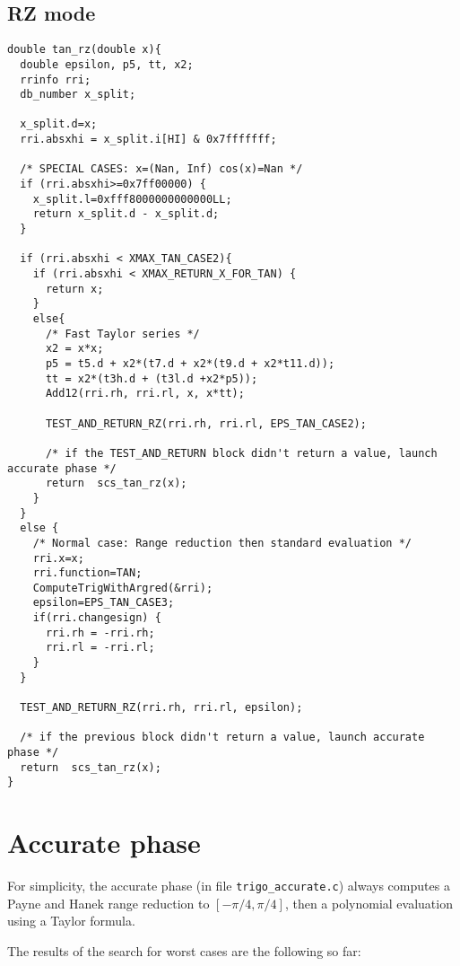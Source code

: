 \subsection{RZ mode}
\begin{lstlisting}[caption={Exceptional cases for tangent RZ},firstnumber=1]
double tan_rz(double x){  
  double epsilon, p5, tt, x2;
  rrinfo rri;
  db_number x_split;

  x_split.d=x;
  rri.absxhi = x_split.i[HI] & 0x7fffffff;
  
  /* SPECIAL CASES: x=(Nan, Inf) cos(x)=Nan */
  if (rri.absxhi>=0x7ff00000) {
    x_split.l=0xfff8000000000000LL;
    return x_split.d - x_split.d;
  }   
  
  if (rri.absxhi < XMAX_TAN_CASE2){
    if (rri.absxhi < XMAX_RETURN_X_FOR_TAN) {
      return x;
    }
    else{ 
      /* Fast Taylor series */
      x2 = x*x;
      p5 = t5.d + x2*(t7.d + x2*(t9.d + x2*t11.d));
      tt = x2*(t3h.d + (t3l.d +x2*p5));
      Add12(rri.rh, rri.rl, x, x*tt);  

      TEST_AND_RETURN_RZ(rri.rh, rri.rl, EPS_TAN_CASE2);

      /* if the TEST_AND_RETURN block didn't return a value, launch accurate phase */
      return  scs_tan_rz(x);
    }
  }
  else { 
    /* Normal case: Range reduction then standard evaluation */
    rri.x=x;
    rri.function=TAN;
    ComputeTrigWithArgred(&rri);
    epsilon=EPS_TAN_CASE3; 
    if(rri.changesign) {
      rri.rh = -rri.rh; 
      rri.rl = -rri.rl;
    }
  }

  TEST_AND_RETURN_RZ(rri.rh, rri.rl, epsilon);

  /* if the previous block didn't return a value, launch accurate phase */
  return  scs_tan_rz(x); 
}
\end{lstlisting}

 


\section{Accurate phase}

For simplicity, the accurate phase (in file \texttt{trigo\_accurate.c}) always
computes a Payne and Hanek range reduction to $[-\pi/4, \pi/4]$,
then a polynomial evaluation using a Taylor formula.

The results of the search for worst cases are the following so far:

